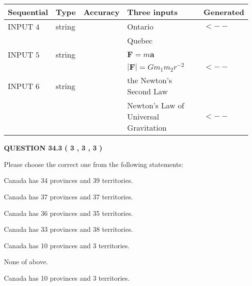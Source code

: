 \documentclass[12pt]{article}
\begin{document}
   
  
  
\noindent\begin{tabular}{|l|l|l|l|l|}
\hline
 Sequential & Type & Accuracy & Three inputs & Generated \\ 
\hline
 
 
  INPUT $            4 $ & string & & 
 Ontario & 
  $ <-- $ 
  \\
  & & & 
 Quebec & 
 \\  \hline  
 
 
  INPUT $            5 $ & string & & 
 $\mathbf{F}=m\mathbf{a}$ & 
  \\
  & & & 
 $\left| \mathbf{F}\right| =Gm_1m_2r^{-2}$ & 
  $ <-- $ 
 \\  \hline  
 
 
  INPUT $            6 $ & string & & 
 the Newton's Second Law & 
  \\
  & & & 
 Newton's Law of Universal Gravitation & 
  $ <-- $ 
 \\  \hline  
 \end{tabular}
   
   
  
\vspace{0.2in}
  
{\textbf{\Large{QUESTION
34.3 
 (           3 ,           3 ,           3 )
}}}
  
  
Please choose the correct one from the following statements:
 
 
Canada has  %
34 provinces and  %
39 territories.
 
 
Canada has  %
37 provinces and  %
37 territories.
 
 
Canada has  %
36 provinces and  %
35 territories.
 
 
Canada has  %
33 provinces and  %
38 territories.
 
 
Canada has  %
10 provinces and  %
3 territories.
 
 
 None of above.
 
 
\noindent{}
 
 
Canada has  %
10 provinces and  %
3 territories.
 
 
\noindent{}
 
\end{document}
